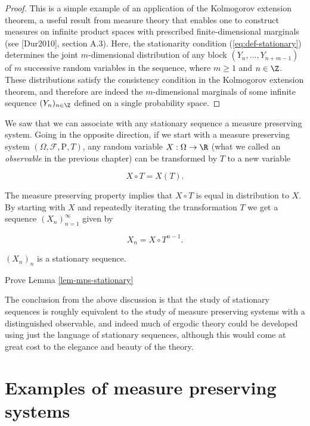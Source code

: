 \begin{proof}
This is a simple example of an application of the
Kolmogorov extension theorem, a useful result from
measure theory that enables one to construct measures
on infinite product spaces with prescribed
finite-dimensional marginals (see [Dur2010], section
A.3). Here, the stationarity condition
(\ref{eq:def-stationary}) determines the joint
$m$-dimensional distribution of any block
$(Y_n,\ldots,Y_{n+m-1})$ of $m$ successive random
variables in the sequence, where $m\ge1$ and $n\in\Z$.
These distributions satisfy the consistency condition
in the Kolmogorov extension theorem, and therefore are
indeed the $m$-dimensional marginals of some infinite
sequence $(Y_n)_{n\in\Z}$ defined on a single
probability space.
\end{proof}

\noindent We saw that we can associate with any stationary
sequence a measure preserving system. Going in the
opposite direction, if we start with a measure
preserving system
$(\Omega, \mathcal{F}, \mathrm{P}, T)$, any random
variable $X:\Omega\to\R$ (what we called an
\emph{observable} in the previous chapter) can be
transformed by $T$ to a new variable

\[
X\circ T = X(T).
\]

\noindent The measure preserving property implies that
$X\circ T$ is equal in distribution to $X$. By
starting with $X$ and repeatedly iterating the
transformation $T$ we get a sequence
$(X_n)_{n=1}^\infty$ given by

\[
X_n = X\circ T^{n-1}.
\]

\begin{lem}
\label{lem-mps-stationary}
$(X_n)_n$ is a stationary sequence.
\end{lem}

\begin{xexercise}
Prove Lemma \ref{lem-mps-stationary}
\end{xexercise}

\noindent The conclusion from the above discussion is that the
study of stationary sequences is roughly equivalent to
the study of measure preserving systems with a
distinguished observable, and indeed much of ergodic
theory could be developed using just the language of
stationary sequences, although this would come at
great cost to the elegance and beauty of the theory.

\section{Examples of measure preserving systems}

